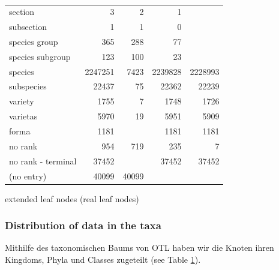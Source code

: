 \begin{table}[h!]
\begin{center}
\begin{tabular}{ |l|r||r|r|r| }
          section & 3 & 2 & 1 & \\
          subsection & 1 & 1 & 0 & \\
          species group & 365 & 288 & 77 & \\
          species subgroup & 123 & 100 & 23 & \\ \hline
          \setrow{\bfseries}species & 2247251 & 7423 & 2239828 & 2228993 \\
          subspecies & 22437 & 75 & 22362 & 22239 \\
          variety & 1755 & 7 & 1748 & 1726 \\
          varietas & 5970 & 19 & 5951 & 5909 \\
          forma & 1181 & & 1181 & 1181 \\
          \hline \hline
          no rank & 954 & 719 & 235 & 7 \\
          no rank - terminal & 37452 & & 37452 & 37452 \\
          (no entry) & 40099 & 40099 & & \\
          \hline  
        \end{tabular}
        \caption{}
        \label{table:...} 
      \end{center}  
    \end{table}
    extended leaf nodes (real leaf nodes)

  \subsubsection{Distribution of data in the taxa}
    Mithilfe des taxonomischen Baums von OTL haben wir die Knoten ihren Kingdoms, Phyla und Classes 
      zugeteilt (see Table \ref{table:...}). \\

